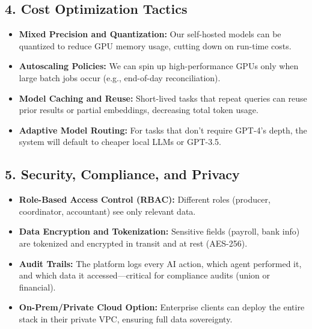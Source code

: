 \documentclass[11pt]{article}
\begin{document}
\subsection{4. Cost Optimization Tactics}
\begin{itemize}
    \item \textbf{Mixed Precision and Quantization:} Our self-hosted models can be quantized to reduce GPU memory usage, cutting down on run-time costs.
    \item \textbf{Autoscaling Policies:} We can spin up high-performance GPUs only when large batch jobs occur (e.g., end-of-day reconciliation).
    \item \textbf{Model Caching and Reuse:} Short-lived tasks that repeat queries can reuse prior results or partial embeddings, decreasing total token usage.
    \item \textbf{Adaptive Model Routing:} For tasks that don’t require GPT-4’s depth, the system will default to cheaper local LLMs or GPT-3.5.
\end{itemize}

\subsection{5. Security, Compliance, and Privacy}
\begin{itemize}
    \item \textbf{Role-Based Access Control (RBAC):} Different roles (producer, coordinator, accountant) see only relevant data.
    \item \textbf{Data Encryption and Tokenization:} Sensitive fields (payroll, bank info) are tokenized and encrypted in transit and at rest (AES-256).
    \item \textbf{Audit Trails:} The platform logs every AI action, which agent performed it, and which data it accessed—critical for compliance audits (union or financial).
    \item \textbf{On-Prem/Private Cloud Option:} Enterprise clients can deploy the entire stack in their private VPC, ensuring full data sovereignty.
\end{itemize}
\end{document}
